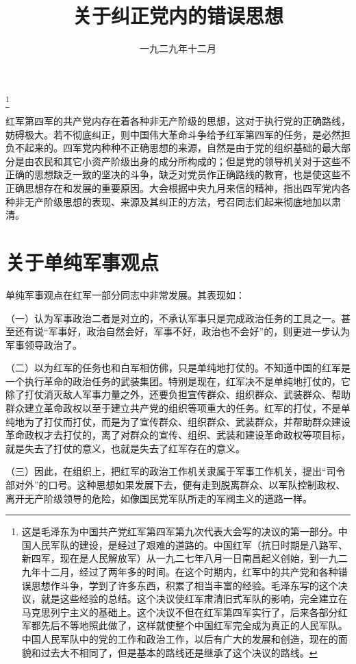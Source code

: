 
\title{关于纠正党内的错误思想}
\date{一九二九年十二月}
\thanks{这是毛泽东为中国共产党红军第四军第九次代表大会写的决议的第一部分。中国人民军队的建设，是经过了艰难的道路的。中国红军（抗日时期是八路军、新四军，现在是人民解放军）从一九二七年八月一日南昌起义创始，到一九二九年十二月，经过了两年多的时间。在这个时期内，红军中的共产党和各种错误思想作斗争，学到了许多东西，积累了相当丰富的经验。毛泽东写的这个决议，就是这些经验的总结。这个决议使红军肃清旧式军队的影响，完全建立在马克思列宁主义的基础上。这个决议不但在红军第四军实行了，后来各部分红军都先后不等地照此做了，这样就使整个中国红军完全成为真正的人民军队。中国人民军队中的党的工作和政治工作，以后有广大的发展和创造，现在的面貌和过去大不相同了，但是基本的路线还是继承了这个决议的路线。}
\maketitle


红军第四军的共产党内存在着各种非无产阶级的思想，这对于执行党的正确路线，妨碍极大。若不彻底纠正，则中国伟大革命斗争给予红军第四军的任务，是必然担负不起来的。四军党内种种不正确思想的来源，自然是由于党的组织基础的最大部分是由农民和其它小资产阶级出身的成分所构成的；但是党的领导机关对于这些不正确的思想缺乏一致的坚决的斗争，缺乏对党员作正确路线的教育，也是使这些不正确思想存在和发展的重要原因。大会根据中央九月来信的精神，指出四军党内各种非无产阶级思想的表现、来源及其纠正的方法，号召同志们起来彻底地加以肃清。

\section{关于单纯军事观点}

单纯军事观点在红军一部分同志中非常发展。其表现如：

（一）认为军事政治二者是对立的，不承认军事只是完成政治任务的工具之一。甚至还有说“军事好，政治自然会好，军事不好，政治也不会好”的，则更进一步认为军事领导政治了。

（二）以为红军的任务也和白军相仿佛，只是单纯地打仗的。不知道中国的红军是一个执行革命的政治任务的武装集团。特别是现在，红军决不是单纯地打仗的，它除了打仗消灭敌人军事力量之外，还要负担宣传群众、组织群众、武装群众、帮助群众建立革命政权以至于建立共产党的组织等项重大的任务。红军的打仗，不是单纯地为了打仗而打仗，而是为了宣传群众、组织群众、武装群众，并帮助群众建设革命政权才去打仗的，离了对群众的宣传、组织、武装和建设革命政权等项目标，就是失去了打仗的意义，也就是失去了红军存在的意义。

（三）因此，在组织上，把红军的政治工作机关隶属于军事工作机关，提出“司令部对外”的口号。这种思想如果发展下去，便有走到脱离群众、以军队控制政权、离开无产阶级领导的危险，如像国民党军队所走的军阀主义的道路一样。

